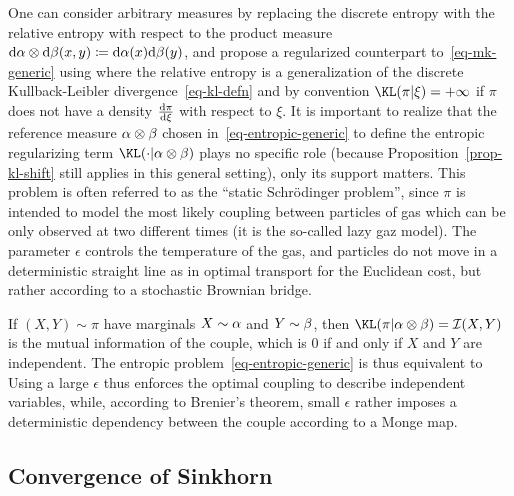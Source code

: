 One can consider arbitrary measures by replacing the discrete entropy with the relative entropy with respect to the product measure $\mathrm{d}\alpha\otimes\mathrm{d}\beta(x,y) \coloneqq \mathrm{d}\alpha(x)\mathrm{d}\beta(y)$, and propose a regularized counterpart to~\eqref{eq-mk-generic} using
where the relative entropy is a generalization of the discrete Kullback-Leibler divergence~\eqref{eq-kl-defn}
and by convention $\KL(\pi|\xi)=+\infty$ if $\pi$ does not have a density $\frac{\mathrm{d} \pi}{\mathrm{d}\xi}$ with respect to $\xi$. 
%
It is important to realize that the reference measure $\alpha\otimes\beta$ chosen in~\eqref{eq-entropic-generic} to define the entropic regularizing term $\KL(\cdot|\al\otimes\be)$ plays no specific role (because Proposition~\ref{prop-kl-shift} still applies in this general setting), only its support matters.
%
This problem is often referred to as the ``static Schr\"odinger problem'', since $\pi$ is intended to model the most likely coupling between particles of gas which can be only observed at two different times (it is the so-called lazy gaz model). The parameter $\epsilon$ controls the temperature of the gas, and particles do not move in a deterministic straight line as in optimal transport for the Euclidean cost, but rather according to a stochastic Brownian bridge. 

\begin{rem}
	If $(X,Y) \sim \pi$ have marginals $X \sim \alpha$ and $Y \sim \beta$, then $\KL(\pi|\al \otimes \be) = \Ii(X,Y)$ is the mutual information of the couple, which is 0 if and only if $X$ and $Y$ are independent. The entropic problem~\eqref{eq-entropic-generic} is thus equivalent to
	Using a large $\epsilon$ thus enforces the optimal coupling to describe independent variables, while, according to Brenier's theorem, small $\epsilon$ rather imposes a deterministic dependency between the couple according to a Monge map. 
\end{rem}


\subsection{Convergence of Sinkhorn}
\label{sec-convergence-init}

